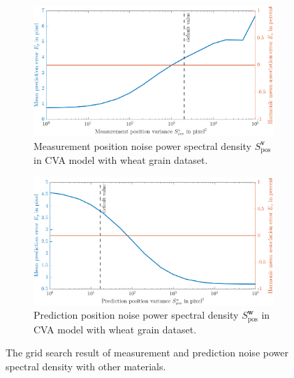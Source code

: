 \begin{figure}
    \ContinuedFloat
    \centering
	\begin{subfigure}[t]{0.8\textwidth}
		\includegraphics[width=\textwidth]{figures/KF/appendix/w cva meacov.png}
		\caption{Measurement position noise power spectral density     $S_{\mathrm{pos}}^{\boldsymbol{v}}$ in CVA model with wheat grain dataset.}
	\end{subfigure}
	\begin{subfigure}[t]{0.8\textwidth}
		\includegraphics[width=\textwidth]{figures/KF/appendix/w cva precov.png}
		\caption{Prediction position noise power spectral density     $S_{\mathrm{pos}}^{\boldsymbol{w}}$ in CVA model with wheat grain dataset.}
	\end{subfigure}
	\caption{The grid search result of measurement and prediction noise power spectral density with other materials.}
	\label{grid search other material}
\end{figure}


